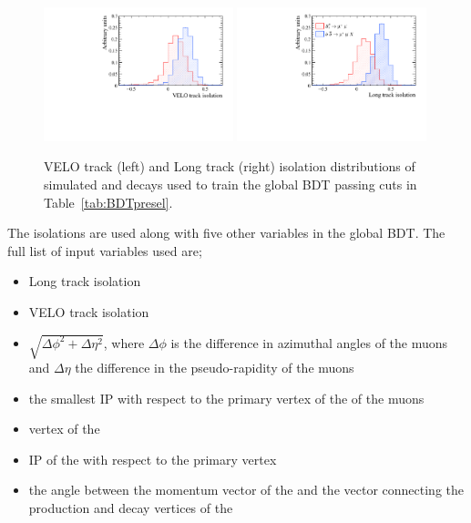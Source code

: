 \begin{figure}[htbp]
    \centering
        \includegraphics[width=0.49\textwidth]{./Figs/Selection/iso_vel_Mar.pdf}
              \includegraphics[width=0.49\textwidth]{./Figs/Selection/long_track_Mar.pdf}
           \caption{VELO track (left) and Long track (right) isolation distributions of simulated \bsmumu and \bbbarmumux decays used to train the global BDT passing cuts in Table~\ref{tab:BDTpresel}.}
    \label{fig:Isolations}
\end{figure}

The isolations are used along with five other variables in the global BDT. The full list of input variables used are;
\begin{itemize}
\item Long track isolation
\item VELO track isolation
\item $\sqrt{\Delta \phi^{2} + \Delta \eta^{2}}$, where $\Delta \phi$ is the difference in azimuthal angles of the muons and $\Delta \eta$ the difference in the pseudo-rapidity of the muons
\item the smallest IP \chisqd with respect to the primary vertex of the \bsmumu of the muons
\item vertex \chisqd of the \bs
\item IP \chisqd of the \bs with respect to the primary vertex
\item the angle between the momentum vector of the \bs and the vector connecting the production and decay vertices of the \bs
\end{itemize}

